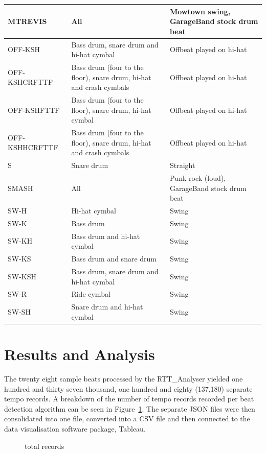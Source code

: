 \documentclass[a4paper, 11pt]{article}
\begin{document}
\begin{table}[htbp]
\begin{tabular}{|p{3cm}|p{5cm}|l|}
\hline 
MTREVIS & All & Mowtown swing, GarageBand stock drum beat\\
\hline 
OFF-KSH & Bass drum, snare drum and hi-hat cymbal & Offbeat played on hi-hat\\
\hline 
OFF-KSHCRFTTF & Bass drum (four to the floor), snare drum, hi-hat and crash cymbals & Offbeat played on hi-hat\\
\hline 
OFF-KSHFTTF & Bass drum (four to the floor), snare drum, hi-hat cymbal & Offbeat played on hi-hat\\
\hline 
OFF-KSHHCRFTTF & Bass drum (four to the floor), snare drum, hi-hat and crash cymbals & Offbeat played on hi-hat\\
\hline 
S & Snare drum & Straight\\
\hline 
SMASH & All & Punk rock (loud), GarageBand stock drum beat\\
\hline 
SW-H & Hi-hat cymbal & Swing\\
\hline 
SW-K & Bass drum & Swing\\
\hline 
SW-KH & Bass drum and hi-hat cymbal & Swing\\
\hline 
SW-KS & Bass drum and snare drum & Swing\\
\hline 
SW-KSH & Bass drum, snare drum and hi-hat cymbal & Swing\\
\hline 
SW-R & Ride cymbal & Swing\\
\hline 
SW-SH & Snare drum and hi-hat cymbal & Swing\\
\hline
\end{tabular}
\label{tab: beats}
\end{table}

\maketitle \section{Results and Analysis}
The twenty eight sample beats processed by the RTT\_Analyser yielded one hundred and thirty seven thousand, one hundred and eighty (137,180) separate tempo records. A breakdown of the number of tempo records recorded per beat detection algorithm can be seen in Figure~\ref{fig: totrec}. The separate JSON files were then consolidated into one file, converted into a CSV file and then connected to the data visualisation software package, Tableau\cite{tableau}.

\begin{figure}
\caption{total records}
\label{fig: totrec}
\end{figure}
\end{document}
